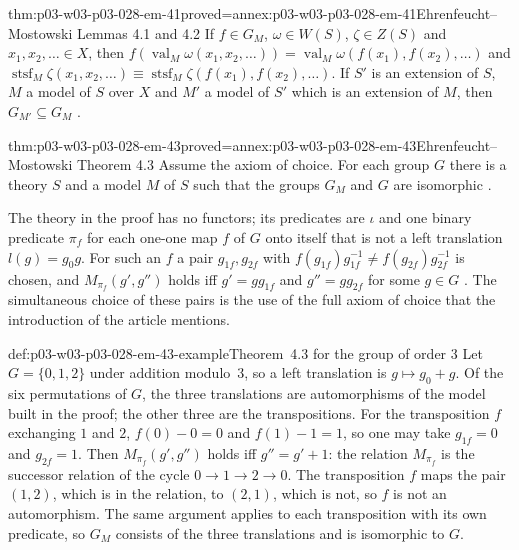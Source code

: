 \begin{hblemma}{thm:p03-w03-p03-028-em-41}{proved=annex:p03-w03-p03-028-em-41}{Ehrenfeucht--Mostowski Lemmas 4.1 and 4.2}
If \(f\in G_M\), \(\omega\in W(S)\), \(\zeta\in Z(S)\) and
\(x_1,x_2,\ldots\in X\), then
\(f(\operatorname{val}_M\omega(x_1,x_2,\ldots))
=\operatorname{val}_M\omega(f(x_1),f(x_2),\ldots)\) and
\(\operatorname{stsf}_M\zeta(x_1,x_2,\ldots)\equiv
\operatorname{stsf}_M\zeta(f(x_1),f(x_2),\ldots)\).  If \(S'\) is an
extension of \(S\), \(M\) a model of \(S\) over \(X\) and \(M'\) a model of
\(S'\) which is an extension of \(M\), then \(G_{M'}\subseteq G_M\)
\cite[Lemmas~4.1--4.2, p.~56]{EhrenfeuchtMostowski1956}.
\end{hblemma}

\begin{hbtheorem}{thm:p03-w03-p03-028-em-43}{proved=annex:p03-w03-p03-028-em-43}{Ehrenfeucht--Mostowski Theorem 4.3}
Assume the axiom of choice.  For each group \(G\) there is a theory \(S\) and
a model \(M\) of \(S\) such that the groups \(G_M\) and \(G\) are isomorphic
\cite[Theorem~4.3, p.~56, proof pp.~56--57]{EhrenfeuchtMostowski1956}.
\end{hbtheorem}

The theory in the proof has no functors; its predicates are \(\iota\) and
one binary predicate \(\pi_f\) for each one-one map \(f\) of \(G\) onto itself
that is not a left translation \(l(g)=g_0g\).  For such an \(f\) a pair
\(g_{1f},g_{2f}\) with \(f(g_{1f})g_{1f}^{-1}\neq f(g_{2f})g_{2f}^{-1}\) is
chosen, and \(M_{\pi_f}(g',g'')\) holds iff \(g'=gg_{1f}\) and \(g''=gg_{2f}\)
for some \(g\in G\) \cite[(4.3.1), p.~56]{EhrenfeuchtMostowski1956}.  The
simultaneous choice of these pairs is the use of the full axiom of choice
that the introduction of the article mentions.

\begin{hbexample}{def:p03-w03-p03-028-em-43-example}{Theorem~4.3 for the group of order 3}
Let \(G=\{0,1,2\}\) under addition modulo~3, so a left translation is
\(g\mapsto g_0+g\).  Of the six permutations of \(G\), the three translations
are automorphisms of the model built in the proof; the other three are the
transpositions.  For the transposition \(f\) exchanging \(1\) and \(2\),
\(f(0)-0=0\) and \(f(1)-1=1\), so one may take \(g_{1f}=0\) and
\(g_{2f}=1\).  Then \(M_{\pi_f}(g',g'')\) holds iff \(g''=g'+1\): the
relation \(M_{\pi_f}\) is the successor relation of the cycle
\(0\to1\to2\to0\).  The transposition \(f\) maps the pair \((1,2)\), which is
in the relation, to \((2,1)\), which is not, so \(f\) is not an automorphism.
The same argument applies to each transposition with its own predicate, so
\(G_M\) consists of the three translations and is isomorphic to \(G\).
\end{hbexample}

